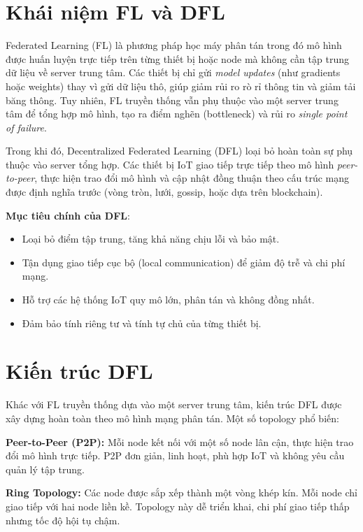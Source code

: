 
\section{Khái niệm FL và DFL}

\hspace{0.6cm}Federated Learning (FL) \cite{mcmahan2016} là phương pháp học máy phân tán trong đó mô hình được 
huấn luyện trực tiếp trên từng thiết bị hoặc node mà không cần tập trung dữ liệu 
về server trung tâm. Các thiết bị chỉ gửi \textit{model updates} (như gradients 
hoặc weights) thay vì gửi dữ liệu thô, giúp giảm rủi ro rò rỉ thông tin và giảm tải 
băng thông. Tuy nhiên, FL truyền thống vẫn phụ thuộc vào một server trung tâm để 
tổng hợp mô hình, tạo ra điểm nghẽn (bottleneck) và rủi ro \textit{single point of failure}.

Trong khi đó, Decentralized Federated Learning (DFL) loại bỏ hoàn toàn sự phụ 
thuộc vào server tổng hợp. Các thiết bị IoT giao tiếp trực tiếp theo mô hình 
\textit{peer-to-peer}, thực hiện trao đổi mô hình và cập nhật đồng thuận theo cấu trúc 
mạng được định nghĩa trước (vòng tròn, lưới, gossip, hoặc dựa trên blockchain).  

\textbf{Mục tiêu chính của DFL}:

\begin{itemize}
    \item Loại bỏ điểm tập trung, tăng khả năng chịu lỗi và bảo mật.
    \item Tận dụng giao tiếp cục bộ (local communication) để giảm độ trễ và chi phí mạng.
    \item Hỗ trợ các hệ thống IoT quy mô lớn, phân tán và không đồng nhất.
    \item Đảm bảo tính riêng tư và tính tự chủ của từng thiết bị.
\end{itemize}

\section{Kiến trúc DFL}

\hspace{0.6cm}Khác với FL truyền thống dựa vào một server trung tâm, kiến trúc DFL được xây 
dựng hoàn toàn theo mô hình mạng phân tán. Một số topology phổ biến:

\textbf{Peer-to-Peer (P2P):}  
Mỗi node kết nối với một số node lân cận, thực hiện trao đổi mô hình trực tiếp. 
P2P đơn giản, linh hoạt, phù hợp IoT và không yêu cầu quản lý tập trung.

\textbf{Ring Topology:}  
Các node được sắp xếp thành một vòng khép kín. Mỗi node chỉ giao tiếp với 
hai node liền kề. Topology này dễ triển khai, chi phí giao tiếp thấp nhưng tốc độ 
hội tụ chậm.

